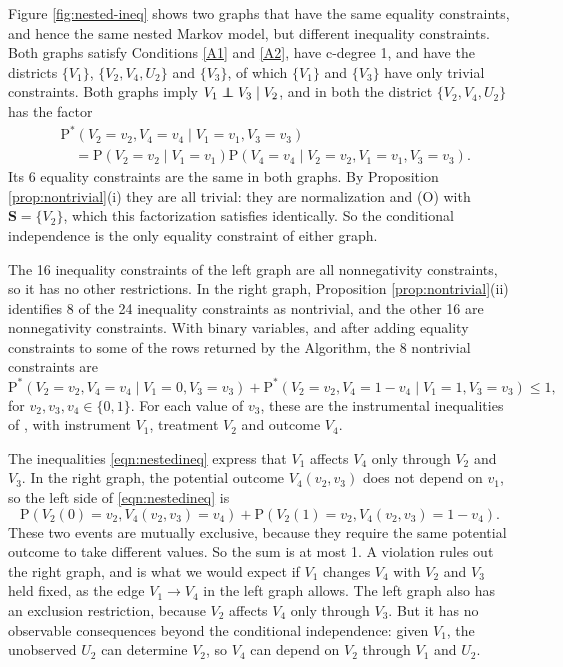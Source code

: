 \documentclass[12pt]{article}
\newcommand\indep{\protect\mathpalette{\protect\independenT}{\perp}}
\def\independenT#1#2{\mathrel{\rlap{$#1#2$}\mkern2mu{#1#2}}}
\def\Pr{{\mathrm{P}}}
\def\Pdo{{\mathrm{P}^*}}
\newcommand{\bS}{\boldsymbol{S}}
\begin{document}
Figure \ref{fig:nested-ineq} shows two graphs that have the same equality constraints, and hence the same nested Markov model, but different inequality constraints. Both graphs satisfy Conditions \ref{A1} and \ref{A2}, have c-degree 1, and have the districts $\{V_1\}$, $\{V_2, V_4, U_2\}$ and $\{V_3\}$, of which $\{V_1\}$ and $\{V_3\}$ have only trivial constraints. Both graphs imply $V_1 \indep V_3 \mid V_2$, and in both the district $\{V_2, V_4, U_2\}$ has the factor
\begin{align*}
& \Pdo(V_2 = v_2, V_4 = v_4 \mid V_1 = v_1, V_3 = v_3) \\
& \quad = \Pr(V_2 = v_2 \mid V_1 = v_1) \Pr(V_4 = v_4 \mid V_2 = v_2, V_1 = v_1, V_3 = v_3).
\end{align*}
Its 6 equality constraints are the same in both graphs. By Proposition \ref{prop:nontrivial}(i) they are all trivial: they are normalization and (O) with $\bS = \{V_2\}$, which this factorization satisfies identically. So the conditional independence is the only equality constraint of either graph.

The 16 inequality constraints of the left graph are all nonnegativity constraints, so it has no other restrictions. In the right graph, Proposition \ref{prop:nontrivial}(ii) identifies 8 of the 24 inequality constraints as nontrivial, and the other 16 are nonnegativity constraints. With binary variables, and after adding equality constraints to some of the rows returned by the Algorithm, the 8 nontrivial constraints are
\begin{equation}
\Pdo(V_2 = v_2, V_4 = v_4 \mid V_1 = 0, V_3 = v_3) + \Pdo(V_2 = v_2, V_4 = 1 - v_4 \mid V_1 = 1, V_3 = v_3) \leq 1, \label{eqn:nestedineq}
\end{equation}
for $v_2, v_3, v_4 \in \{0, 1\}$. For each value of $v_3$, these are the instrumental inequalities of \citet{pearl1995testability}, with instrument $V_1$, treatment $V_2$ and outcome $V_4$.

The inequalities \eqref{eqn:nestedineq} express that $V_1$ affects $V_4$ only through $V_2$ and $V_3$. In the right graph, the potential outcome $V_4(v_2, v_3)$ does not depend on $v_1$, so the left side of \eqref{eqn:nestedineq} is
\[
\Pr(V_2(0) = v_2, V_4(v_2, v_3) = v_4) + \Pr(V_2(1) = v_2, V_4(v_2, v_3) = 1 - v_4).
\]
These two events are mutually exclusive, because they require the same potential outcome to take different values. So the sum is at most 1. A violation rules out the right graph, and is what we would expect if $V_1$ changes $V_4$ with $V_2$ and $V_3$ held fixed, as the edge $V_1 \rightarrow V_4$ in the left graph allows. The left graph also has an exclusion restriction, because $V_2$ affects $V_4$ only through $V_3$. But it has no observable consequences beyond the conditional independence: given $V_1$, the unobserved $U_2$ can determine $V_2$, so $V_4$ can depend on $V_2$ through $V_1$ and $U_2$.
\end{document}

